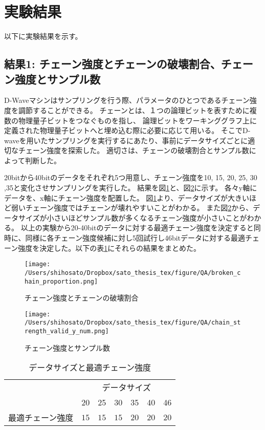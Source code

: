 \documentclass[12pt, dvipdfmx]{jmaster}
\theoremstyle{definition}
\begin{document}
\section{実験結果}
以下に実験結果を示す。

\subsection{結果1: チェーン強度とチェーンの破壊割合、チェーン強度とサンプル数}
\label{sec:chain}
D-Waveマシンはサンプリングを行う際、パラメータのひとつであるチェーン強度を調節することができる。
チェーンとは、１つの論理ビットを表すために複数の物理量子ビットをつなぐものを指し、
論理ビットをワーキンググラフ上に定義された物理量子ビットへと埋め込む際に必要に応じて用いる。
そこでD-waveを用いたサンプリングを実行するにあたり、事前にデータサイズごとに適切なチェーン強度を探索した。
適切さは、チェーンの破壊割合とサンプル数によって判断した。

20bitから40bitのデータをそれぞれ5つ用意し、チェーン強度を10, 15, 20, 25, 30 ,35と変化させサンプリングを実行した。
結果を図\ref{fig:broken}と、図\ref{fig:chain_num_sample}に示す。
各々y軸にデータを、x軸にチェーン強度を配置した。
図\ref{fig:broken}より、データサイズが大きいほど弱いチェーン強度ではチェーンが壊れやすいことがわかる。
また図\ref{fig:chain_num_sample}から、データサイズが小さいほどサンプル数が多くなるチェーン強度が小さいことがわかる。
以上の実験から20-40bitのデータに対する最適チェーン強度を決定すると同時に、同様に各チェーン強度候補に対し5回試行し46bitデータに対する最適チェーン強度を決定した。以下の表\ref{tb:chain_strength_datasize}にそれらの結果をまとめた。

\begin{figure}
	\begin{center}
		\texttt{[image: /Users/shihosato/Dropbox/sato\_thesis\_tex/figure/QA/broken\_chain\_proportion.png]}
	\end{center}
	\caption{チェーン強度とチェーンの破壊割合}
	\label{fig:broken}
\end{figure}

\begin{figure}
	\begin{center}
		\texttt{[image: /Users/shihosato/Dropbox/sato\_thesis\_tex/figure/QA/chain\_strength\_valid\_y\_num.png]}
	\end{center}
	\caption{チェーン強度とサンプル数}
	\label{fig:chain_num_sample}
\end{figure}

\begin{table}[hbtp]
	\caption{データサイズと最適チェーン強度}
	\label{tb:chain_strength_datasize}
	\centering
	\begin{tabular}{lcccccc}
		\hline
		&\multicolumn{6}{c}{データサイズ} \\
		& 20 & 25 & 30 & 35 & 40 & 46\\
		\hline\hline
		最適チェーン強度 & $15$ & $15$ & $15$ & $20$ & $20$ & $20$\\
		\hline
	\end{tabular}
\end{table}
\end{document}
